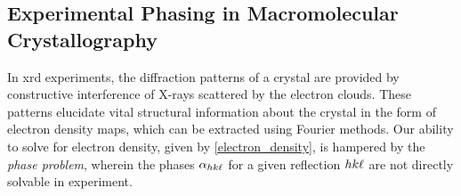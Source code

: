 

\subsection{Experimental Phasing in Macromolecular Crystallography}




In \ac{xrd} experiments, the diffraction patterns of a crystal are provided by constructive interference of X-rays scattered by the electron clouds. These patterns elucidate vital structural information about the crystal in the form of electron density maps, which can be extracted using Fourier methods. Our ability to solve for electron density, given by \cref{electron_density}, is hampered by the \textit{phase problem}, wherein the phases $\alpha_{hk\ell}$ for a given reflection $hk\ell$ are not directly solvable in experiment. 

